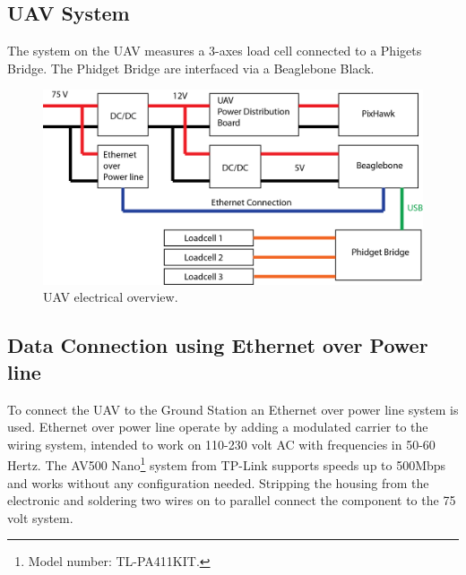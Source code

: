 \subsection{UAV System}
The system on the UAV measures a 3-axes load cell connected to a Phigets Bridge. The Phidget Bridge are interfaced via a Beaglebone Black.  

\begin{figure}[hbtp]
\centering
\includegraphics[scale=0.75]{graphics/UAV-electrical-system.png}
\caption{UAV electrical overview.}
\end{figure}



\subsection{Data Connection using Ethernet over Power line}
To connect the UAV to the Ground Station an Ethernet over power line system is used. Ethernet over power line operate by adding a modulated carrier to the wiring system, intended to work on 110-230 volt AC with frequencies in 50-60 Hertz. The AV500 Nano\footnote{Model number: TL-PA411KIT.} system from TP-Link supports speeds up to 500Mbps and works without any configuration needed. Stripping the housing from the electronic and soldering two wires on to parallel connect the component to the 75 volt system. 

